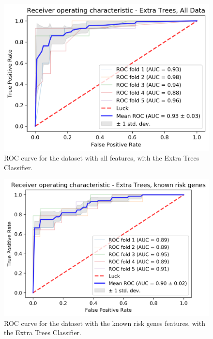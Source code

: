 \newpage

\begin{figure}[H]
	\centering
	\includegraphics[width=5in]{../images/results/ET_all.png}
	\caption{ROC curve for the dataset with all features, with the Extra Trees Classifier.} 
	\label{fig:ET_all}
\end{figure}

\begin{figure}[H]
	\centering
	\includegraphics[width=5in]{../images/results/ET_risk.png}
	\caption{ROC curve for the dataset with the known risk genes features, with the Extra Trees Classifier.} 
	\label{fig:ET_risk}
\end{figure}


